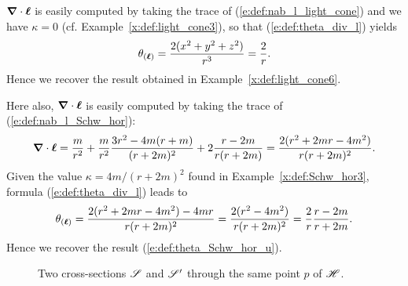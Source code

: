 {\begin{example}  \label{x:def:light_cone7}
$\bm{\nabla}\cdot\bm{\ell}$ is easily computed by taking the trace of
(\ref{e:def:nab_l_light_cone}) and we have $\kappa=0$ (cf. Example~\ref{x:def:light_cone3}),
so that (\ref{e:def:theta_div_l}) yields
\[
    \theta_{(\bm{\ell})} = \frac{2(x^2+y^2+z^2)}{r^3} = \frac{2}{r} .
\]
Hence we recover the result obtained in Example~\ref{x:def:light_cone6}.
\end{example}

\begin{example} \label{x:def:Schw_hor7}
Here also, $\bm{\nabla}\cdot\bm{\ell}$ is easily computed by taking the trace of
(\ref{e:def:nab_l_Schw_hor}):
\[
    \bm{\nabla}\cdot\bm{\ell} = \frac{m}{r^2} + \frac{m}{r^2} \frac{3r^2-4m(r+m)}{(r+2m)^2}
        + 2\frac{r-2m}{r(r+2m)} =
    \frac{2(r^2 + 2mr - 4m^2)}{r(r+2m)^2} .
\]
Given the value $\kappa= 4m/(r+2m)^2$ found in Example~\ref{x:def:Schw_hor3},
formula (\ref{e:def:theta_div_l}) leads to
\[
     \theta_{(\bm{\ell})} = \frac{2(r^2 + 2mr - 4m^2) - 4mr}{r(r+2m)^2} = \frac{2(r^2-4m^2)}{r(r+2m)^2}
     = \frac{2}{r} \frac{r-2m}{r+2m} .
\]
Hence we recover the result (\ref{e:def:theta_Schw_hor_u}).
\end{example}

\begin{figure}
\vspace{5cm}
\caption[]{\label{f:def:two_cross_sections} \footnotesize
Two cross-sections $\mathscr{S}$ and $\mathscr{S}'$ through the same point $p$ of $\mathscr{H}$.}
\end{figure}



}
